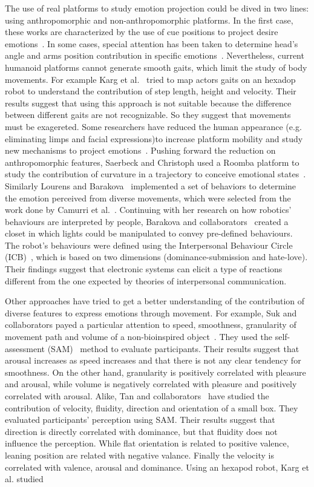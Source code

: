 The use of real platforms to study emotion projection could be dived in two lines: using anthropomorphic and non-anthropomorphic platforms. In the first case, these works are characterized by the use of cue positions to project desire emotions~\cite{NAO2013}. In some cases, special attention has been taken to determine head's angle and arms position contribution in specific emotions~\cite{Brown2014}. 
Nevertheless, current humanoid platforms cannot generate smooth gaits, which limit the study of body movements. For example Karg et al.~\cite{Karg2010} tried to map actors gaits on an hexadop robot to understand the contribution of step length, height and velocity. Their results suggest that using this approach is not suitable because the difference between different gaits are not recognizable. So they suggest that movements must be exagereted.  Some researchers have reduced the human appearance (e.g. eliminating limps and facial expressions)to increase platform mobility and study new mechanisms to project emotions~\cite{Arras2012}. Pushing forward the reduction on anthropomorphic features, Saerbeck and Christoph used a Roomba platform to study the contribution of curvature in a trajectory to conceive emotional states~\cite{Saerbeck2010}. Similarly Lourens and Barakova~\cite{BarakovaL10} implemented a set of behaviors to determine the emotion  perceived from diverse movements, which were selected from the  work done by Camurri et al.~\cite{pop00002}. Continuing with her research on how robotics' behaviours are interpreted by people, Barakova and collaborators~\cite{Barakova2013} created a closet in which lights could be manipulated to convey pre-defined behaviours. The robot's behaviours were defined using the Interpersonal Behaviour Circle (ICB)~\cite{Leary57}, which is based on two dimensions (dominance-submission and hate-love). Their findings suggest that electronic systems can elicit a type of reactions different from the one expected by theories of interpersonal communication.

Other approaches have tried to get a better understanding of the contribution of diverse features to express emotions through movement. For example, Suk and collaborators payed a particular attention to speed, smoothness, granularity of movement path and volume of a non-bioinspired object~\cite{NAM2014}. They used the self-assessment (SAM)~\cite{Lang2008} method to evaluate participants. Their results suggest that arousal increases as speed increases and that there is not any clear tendency for smoothness. On the other hand, granularity is positively correlated with pleasure and arousal, while volume is negatively correlated with pleasure and positively correlated with arousal. Alike, Tan and collaborators~\cite{Tan2016} have studied the contribution of velocity, fluidity, direction and orientation of a small box. They evaluated participants' perception using SAM. Their results suggest that direction is directly correlated with dominance, but that fluidity does not influence the perception. While flat orientation is related to positive valence, leaning position are related with negative valance. Finally the velocity is correlated with valence, arousal and dominance. Using an hexapod robot, Karg et al. studied 

